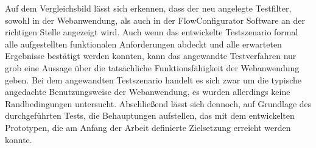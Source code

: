 Auf dem Vergleichsbild lässt sich erkennen, dass der neu angelegte Testfilter, sowohl in der Webanwendung, als auch in der FlowConfigurator Software an der richtigen Stelle angezeigt wird. Auch wenn das entwickelte Testszenario formal alle aufgestellten funktionalen Anforderungen abdeckt und alle erwarteten Ergebnisse bestätigt werden konnten, kann das angewandte Testverfahren nur grob eine Aussage über die tatsächliche Funktionsfähigkeit der Webanwendung geben. Bei dem angewandten Testszenario handelt es sich zwar um die typische angedachte Benutzungsweise der Webanwendung, es wurden allerdings keine Randbedingungen untersucht. Abschließend lässt sich dennoch, auf Grundlage des durchgeführten Tests, die Behauptungen aufstellen, das mit dem entwickelten Prototypen, die am Anfang der Arbeit definierte Zielsetzung erreicht werden konnte.